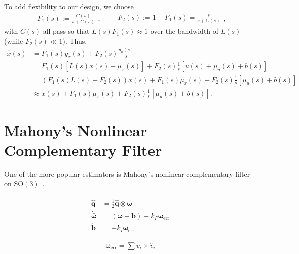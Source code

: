 \documentclass[a4paper]{article}
\begin{document}
To add flexibility to our design, we choose
\begin{equation}
\begin{split}
F_1(s) := \frac{C(s)}{s + C(s)}
\end{split},
\qquad
\begin{split}
F_2(s) := 1 - F_1(s) = \frac{s}{s + C(s)}
\end{split},
\end{equation}
with $C(s)$ all-pass so that $L(s)F_1(s)\approx1$ over the bandwidth of $L(s)$ (while $F_2(s)\ll1$).
Thus,
\begin{align}
\hat{x}(s) &= F_1(s)y_x(s) + F_2(s)\frac{y_u(s)}{s} \nonumber \\
           &= F_1(s)\left[L(s)x(s) + \mu_x(s)\right] + F_2(s)\frac{1}{s}\left[u(s) + \mu_u(s) + b(s)\right] \nonumber \\
           &= (F_1(s)L(s)+F_2(s))x(s) + F_1(s)\mu_x(s) + F_2(s)\frac{1}{s}\left[\mu_u(s) + b(s)\right] \nonumber \\
           &\approx x(s) + F_1(s)\mu_x(s) + F_2(s)\frac{1}{s}\left[\mu_u(s) + b(s)\right].
\end{align}

\section*{Mahony's Nonlinear Complementary Filter}
One of the more popular estimators is Mahony's nonlinear complementary filter on $\mathrm{SO}(3)$~\cite{Mahony2008}.

\begin{align}
  \dot{\bm{\hat{q}}} &= \frac{1}{2} \hat{\bm q} \otimes \bm{\bar \omega} \\
  \dot{\bm{\bar \omega}} &= (\bm{\omega} - \bm{b}) + k_P\bm{\omega}_\text{err} \label{eq:omega_bar_dynamics} \\
  \dot{\bm{b}} &= -k_I\bm{\omega}_\text{err}
\end{align}

\begin{align}
  \bm{\omega}_\text{err} = \sum v_i \times \hat{v}_i
\end{align}

\end{document}
